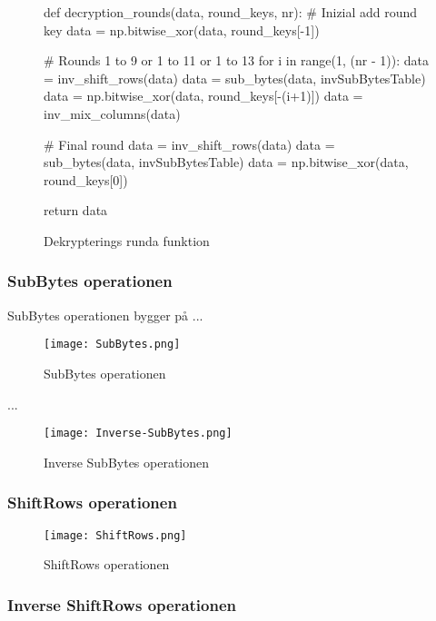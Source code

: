 \begin{figure}[h]
    \centering
    \begin{python}
    def decryption_rounds(data, round_keys, nr):
        # Inizial add round key
        data = np.bitwise_xor(data, round_keys[-1])

        # Rounds 1 to 9 or 1 to 11 or 1 to 13
        for i in range(1, (nr - 1)):
            data = inv_shift_rows(data)
            data = sub_bytes(data, invSubBytesTable)
            data = np.bitwise_xor(data, round_keys[-(i+1)])
            data = inv_mix_columns(data)

        # Final round
        data = inv_shift_rows(data)
        data = sub_bytes(data, invSubBytesTable)
        data = np.bitwise_xor(data, round_keys[0])

        return data
    \end{python}
    \caption{Dekrypterings runda funktion}
    \label{fig:decryption-rounds-function}
\end{figure}

\subsubsection{SubBytes operationen}
\label{sec:aes-subbytes}
SubBytes operationen bygger på ...

\begin{figure}[H]
    \centering
    \texttt{[image: SubBytes.png]}
    \caption{SubBytes operationen}
    \label{fig:aes-subbytes-pic}
\end{figure}

...

\begin{figure}[H]
    \centering
    \texttt{[image: Inverse-SubBytes.png]}
    \caption{Inverse SubBytes operationen}
    \label{fig:aes-inverse-subbytes-pic}
\end{figure}

\subsubsection{ShiftRows operationen}
\label{sec:aes-shiftrows}

\begin{figure}[H]
    \centering
    \texttt{[image: ShiftRows.png]}
    \caption{ShiftRows operationen}
    \label{fig:aes-shiftrows-pic}
\end{figure}

\subsubsection{Inverse ShiftRows operationen}
\label{sec:aes-invers-shiftrows}

